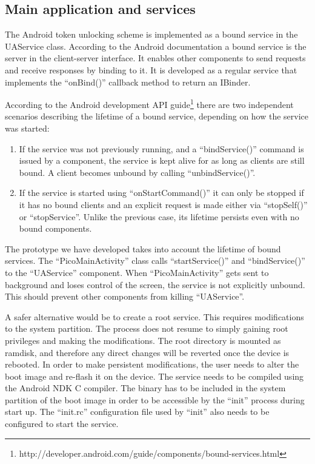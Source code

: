 \subsection{Main application and services}
The Android token unlocking scheme is implemented as a bound service in the UAService class. According to the Android documentation a bound service is the server in the client-server interface. It enables other components to send requests and receive responses by binding to it. It is developed as a regular service that implements the ``onBind()'' callback method to return an IBinder. 

According to the Android development API guide\footnote{http://developer.android.com/guide/components/bound-services.html} there are two independent scenarios describing the lifetime of a bound service, depending on how the service was started:
\begin{enumerate}
	\item If the service was not previously running, and a ``bindService()'' command is issued by a component, the service is kept alive for as long as clients are still bound. A client becomes unbound by calling ``unbindService()''.
	
	\item If the service is started using ``onStartCommand()'' it can only be stopped if it has no bound clients and an explicit request is made either via ``stopSelf()'' or ``stopService''. Unlike the previous case, its lifetime persists even with no bound components.
\end{enumerate}

The prototype we have developed takes into account the lifetime of bound services. The ``PicoMainActivity'' class calls ``startService()'' and ``bindService()'' to the ``UAService'' component. When ``PicoMainActivity'' gets sent to background and loses control of the screen, the service is not explicitly unbound. This should prevent other components from killing ``UAService''. 

A safer alternative would be to create a root service. This requires modifications to the system partition. The process does not resume to simply gaining root privileges and making the modifications. The root directory is mounted as ramdisk, and therefore any direct changes will be reverted once the device is rebooted. In order to make persistent modifications, the user needs to alter the boot image and re-flash it on the device. The service needs to be compiled using the Android NDK C compiler. The binary has to be included in the system partition of the boot image in order to be accessible by the ``init'' process during start up. The ``init.rc'' configuration file used by ``init'' also needs to be configured to start the service.

